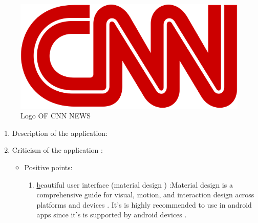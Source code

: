 \begin{figure}[h!]
	\includegraphics[width=13cm]{image3.png}
	\caption{Logo OF CNN NEWS }
	\label{cnn logo}
\end{figure}
\begin{enumerate}
  \item Description of the application:

  \item Criticism of the application :
  
\begin{itemize}
\item Positive points:
\begin{enumerate}
 \item \underline beautiful user interface (material design ) :Material design is a comprehensive guide for visual, motion, and interaction design across platforms and devices . It's is highly recommended to use in android apps since it's is supported by android devices .
 

\end{enumerate}
\end{itemize}
\end{enumerate}
